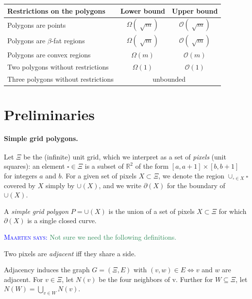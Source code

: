 \documentclass[a4paper, UKenglish]{lipics-v2018}
\newcommand{\mremark}[3]{\textcolor{blue}{\textsc{#1 #2:}} \textcolor{SeaGreen}{\textsf{#3}}}
\newcommand{\maarten}[2][says]{\mremark{Maarten}{#1}{#2}}
\newcommand{\bigo}{\ensuremath{\mathcal O}}
\newcommand{\pix}{\square}
\newcommand{\R}{\mathbb{R}}
\begin{document}
\begin{table}[H]
\begin{tabular}{lcc}
\toprule
Restrictions on the polygons & Lower bound & Upper bound  \\ \midrule
Polygons are points & $\Omega(\sqrt[]{m}) $ & $\bigo(\sqrt[]{m})$ \\
Polygons are $\beta$-fat regions & $\Omega(\sqrt[]{m}) $ & $\bigo(\sqrt[]{m})$ \\
Polygons are convex regions & $\Omega(m) $ & $\bigo(m)$ \\
Two polygons without restrictions &  $\Omega(1)$ & $\bigo(1)$\\
Three polygons without restrictions &  \multicolumn{2}{c}{unbounded}\\
\bottomrule
\end{tabular}
\end{table}


\section{Preliminaries}
\label {sec:prelims}

\paragraph {Simple grid polygons.}

Let $\Xi$ be the (infinite) unit grid, which we interpret as a set of {\em pixels} (unit squares): 
an element $\pix \in \Xi$ is a subset of $\R^2$ of the form $[a,a+1]\times[b,b+1]$ for integers $a$ and $b$.
For a given set of pixels $X \subset \Xi$, we denote the region $\cup_{\pix \in X}\pix$ covered by $X$ simply by $\cup(X)$, and we write $\partial(X)$ for the boundary of $\cup(X)$.

\begin{definition}
A {\em simple grid polygon} $P = \cup(X)$ is the union of a set of pixels $X \subset \Xi$ for which $\partial(X)$ is a single closed curve.
\end{definition}

\maarten {Not sure we need the following definitions.}

\begin{definition}
Two pixels are \emph{adjacent} iff they share a side.
\end{definition}

Adjacency induces the graph $G=(\Xi, E)$ with $(v, w)\in E \iff v$ and $w$ are adjacent.
For $v\in \Xi$, let $N(v)$ be the four neighbors of v. Further for $W\subseteq \Xi$, let $N(W)=\bigcup_{v\in W} N(v)$.
\end{document}
